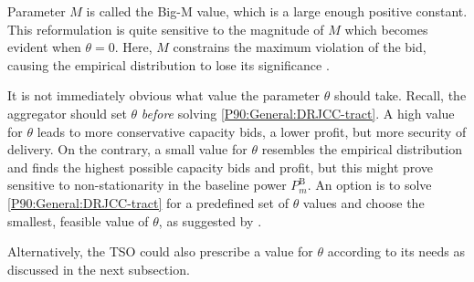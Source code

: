 \documentclass[conference]{IEEEtran}
\begin{document}
Parameter $M$ is called the Big-M value, which is a large enough positive constant. This reformulation is quite sensitive to the magnitude of $M$ which becomes evident when $\theta\!=\!0$. Here, $M$ constrains the maximum violation of the bid, causing the empirical distribution to lose its significance \cite[Theorem 2, Remark 1]{chen2022data}.

It is not immediately obvious what value the parameter $\theta$ should take. Recall, the aggregator should set $\theta$ \textit{before} solving \eqref{P90:General:DRJCC-tract}. A high value for $\theta$ leads to more conservative capacity bids, a lower profit, but more security of delivery. On the contrary, a small value for $\theta$ resembles the empirical distribution and finds the highest possible capacity bids and profit, but this might prove sensitive to non-stationarity in the baseline power $P_{m}^{\text{B}}$. An option is to solve \eqref{P90:General:DRJCC-tract} for a predefined set of $\theta$ values and choose the smallest, feasible value of $\theta$, as suggested by \cite[Section 3.2]{chen2022data}.

Alternatively, the \ac{TSO} could also prescribe a value for $\theta$ according to its needs as discussed in the next subsection.

\vspace{2mm}
\end{document}
